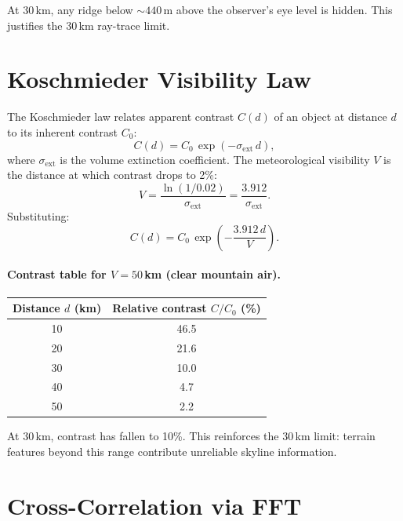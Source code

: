 \noindent At 30\,km, any ridge below $\sim 440$\,m above the observer's eye level is hidden. This justifies the 30\,km ray-trace limit.

\section{Koschmieder Visibility Law}
\label{sec:koschmieder_derivation}

The Koschmieder law relates apparent contrast $C(d)$ of an object at distance $d$ to its inherent contrast $C_0$:
\begin{equation}
C(d) = C_0 \, \exp(-\sigma_{\mathrm{ext}} \, d),
\end{equation}
\noindent where $\sigma_{\mathrm{ext}}$ is the volume extinction coefficient. The meteorological visibility $V$ is the distance at which contrast drops to 2\%:
\begin{equation}
V = \frac{\ln(1/0.02)}{\sigma_{\mathrm{ext}}} = \frac{3.912}{\sigma_{\mathrm{ext}}}.
\end{equation}
\noindent Substituting:
\begin{equation}
C(d) = C_0 \, \exp\!\left(-\frac{3.912 \, d}{V}\right).
\end{equation}

\paragraph{Contrast table for $V = 50$\,km (clear mountain air).}

\begin{center}
\begin{tabular}{cc}
\toprule
Distance $d$ (km) & Relative contrast $C/C_0$ (\%) \\
\midrule
10 & 46.5 \\
20 & 21.6 \\
30 & 10.0 \\
40 & 4.7 \\
50 & 2.2 \\
\bottomrule
\end{tabular}
\end{center}

\noindent At 30\,km, contrast has fallen to 10\%. This reinforces the 30\,km limit: terrain features beyond this range contribute unreliable skyline information.

\section{Cross-Correlation via FFT}
\label{sec:fft_derivation}

